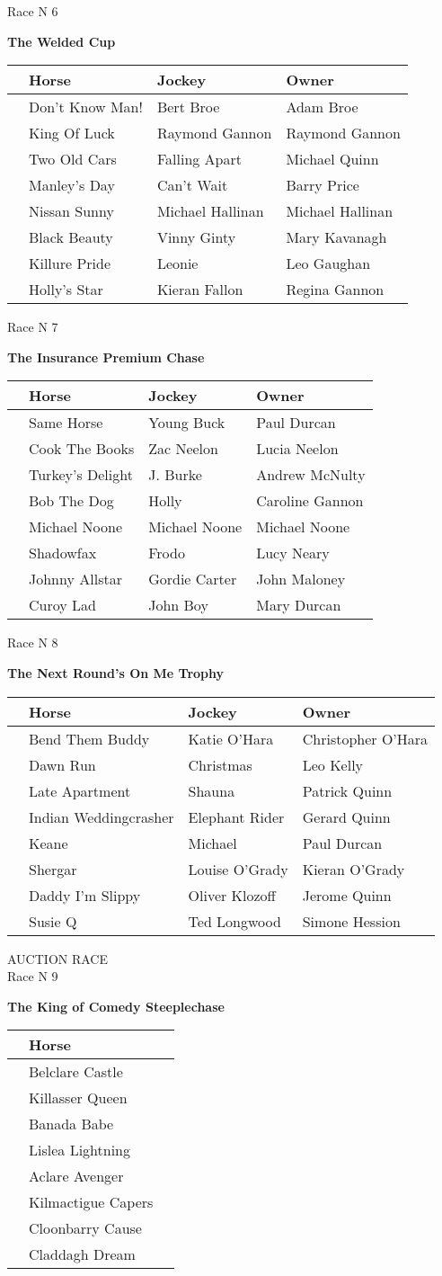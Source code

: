 \documentclass[12pt,a4paper]{article}
\makeatletter
\newcounter{race}
\newcounter{horse}
\newcommand{\racehdr}[3]{%
	\addtocounter{race}{1}\ifodd\therace\newpage\fi%
	\begin{center}{\Huge\sc Race N\raisebox{0.13em}{o} #3\par{\bf #1}\par}\vspace{1em}{\sc Sponsored by #2\par}\vspace{1em}\end{center}}
\newcommand{\auctracehdr}[3]{%
	\addtocounter{race}{1}\newpage%
	\begin{center}{\Huge\sc AUCTION RACE\\Race N\raisebox{0.13em}{o} #3\par{\bf #1}\par}\vspace{1em}{\sc Sponsored by #2\par}\vspace{1em}\end{center}}
\newcommand{\horseracetbl}[3]{\addtocounter{horse}{1}\thehorse & #1 & #2 & #3\\}
\newenvironment{racetbl}{%
	\setcounter{horse}{0}\let\horse=\horseracetbl%
	\begin{center}\begin{large}%
	\begin{tabular}[h]{r@{\hspace{1em}}l@{\hspace{1em}}l@{\hspace{1em}}l}%
	&\bf Horse &\bf Jockey &\bf Owner\\\hline%
}{\end{tabular}\end{large}\end{center}\vspace{1em}}
\newcommand{\auctracetblhorse}[1]{\addtocounter{horse}{1}\thehorse & #1 & \\}
\newenvironment{auctracetbl}{%
	\setcounter{horse}{0}\let\horse=\auctracetblhorse%
	\begin{center}\begin{large}%
	\begin{tabular}[h]{r@{\hspace{1em}}l@{\hspace{1em}}l}%
	&\bf Horse &\bf \makebox[16em]{Owner}\\\hline%
}{\end{tabular}\end{large}\end{center}}
\makeatother
\begin{document}
\racehdr{The Welded Cup}{Tommy Gaughan Welding}{6}
\begin{racetbl}
\horse{Don't Know Man!}{Bert Broe}{Adam Broe}
\horse{King Of Luck}{Raymond Gannon}{Raymond Gannon}
\horse{Two Old Cars}{Falling Apart}{Michael Quinn}
\horse{Manley's Day}{Can't Wait}{Barry Price}
\horse{Nissan Sunny}{Michael Hallinan}{Michael Hallinan}
\horse{Black Beauty}{Vinny Ginty}{Mary Kavanagh}
\horse{Killure Pride}{Leonie}{Leo Gaughan}
\horse{Holly's Star}{Kieran Fallon}{Regina Gannon}
\end{racetbl}
\racehdr{The Insurance Premium Chase}{FBD Insurance Ltd.}{7}
\begin{racetbl}
\horse{Same Horse}{Young Buck}{Paul Durcan}
\horse{Cook The Books}{Zac Neelon}{Lucia Neelon}
\horse{Turkey's Delight}{J. Burke}{Andrew McNulty}
\horse{Bob The Dog}{Holly}{Caroline Gannon}
\horse{Michael Noone}{Michael Noone}{Michael Noone}
\horse{Shadowfax}{Frodo}{Lucy Neary}
\horse{Johnny Allstar}{Gordie Carter}{John Maloney}
\horse{Curoy Lad}{John Boy}{Mary Durcan}
\end{racetbl}
\racehdr{The Next Round's On Me Trophy}{Flynn's Pub, Aclare}{8}
\begin{racetbl}
\horse{Bend Them Buddy}{Katie O'Hara}{Christopher O'Hara}
\horse{Dawn Run}{Christmas}{Leo Kelly}
\horse{Late Apartment}{Shauna}{Patrick Quinn}
\horse{Indian Weddingcrasher}{Elephant Rider}{Gerard Quinn}
\horse{Keane}{Michael}{Paul Durcan}
\horse{Shergar}{Louise O'Grady}{Kieran O'Grady}
\horse{Daddy I'm Slippy}{Oliver Klozoff}{Jerome Quinn}
\horse{Susie Q}{Ted Longwood}{Simone Hession}
\end{racetbl}
\auctracehdr{The King of Comedy Steeplechase}{Yours Truly}{9}

\begin{auctracetbl}
\horse{Belclare Castle}
\horse{Killasser Queen}
\horse{Banada Babe}
\horse{Lislea Lightning}
\horse{Aclare Avenger}
\horse{Kilmactigue Capers}
\horse{Cloonbarry Cause}
\horse{Claddagh Dream}
\end{auctracetbl}
\newpage\vspace*{1pt}
\newpage\vspace*{1pt}
\end{document}

